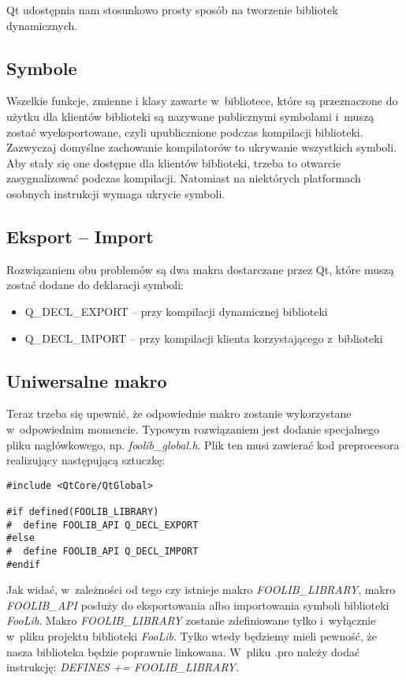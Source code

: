 Qt udostępnia nam stosunkowo prosty sposób na tworzenie bibliotek dynamicznych.

\subsection{Symbole}
Wszelkie funkcje, zmienne i klasy zawarte w~bibliotece, które są przeznaczone do użytku dla klientów biblioteki są nazywane publicznymi symbolami i~muszą zostać wyeksportowane, czyli upublicznione podczas kompilacji biblioteki. Zazwyczaj domyślne zachowanie kompilatorów to ukrywanie wszystkich symboli. Aby stały się one dostępne dla klientów biblioteki, trzeba to otwarcie zasygnalizować podczas kompilacji. Natomiast na niektórych platformach osobnych instrukcji wymaga ukrycie symboli.

\subsection{Eksport -- Import}
Rozwiązaniem obu problemów są dwa makra dostarczane przez Qt, które muszą zostać dodane do deklaracji symboli:
\begin{itemize}
\item{Q\_DECL\_EXPORT -- przy kompilacji dynamicznej biblioteki}
\item{Q\_DECL\_IMPORT -- przy kompilacji klienta korzystającego z~biblioteki}
\end{itemize}

\subsection{Uniwersalne makro}
Teraz trzeba się upewnić, że odpowiednie makro zostanie wykorzystane w~odpowiednim momencie. Typowym rozwiązaniem jest dodanie specjalnego pliku nagłówkowego, np. \textit{foolib\_global.h}. Plik ten musi zawierać kod preprocesora realizujący następującą sztuczkę:
\begin{lstlisting}[caption=Warunkowa kompilacja, label=code:kompilacja:warunkowa]
#include <QtCore/QtGlobal>

#if defined(FOOLIB_LIBRARY)
#  define FOOLIB_API Q_DECL_EXPORT
#else
#  define FOOLIB_API Q_DECL_IMPORT
#endif
\end{lstlisting}

Jak widać, w~zależności od tego czy istnieje makro \textit{FOOLIB\_LIBRARY}, makro \textit{FOOLIB\_API} posłuży do eksportowania albo importowania symboli biblioteki \textit{FooLib}. Makro \textit{FOOLIB\_LIBRARY} zostanie zdefiniowane tylko i~wyłącznie w~pliku projektu biblioteki \textit{FooLib}. Tylko wtedy będziemy mieli pewność, że nasza biblioteka będzie poprawnie linkowana. W~pliku .pro należy dodać instrukcję: \textit{DEFINES +=  FOOLIB\_LIBRARY}.

